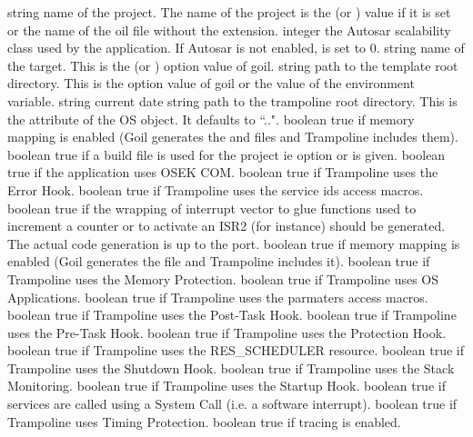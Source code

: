 {string}
{name of the project. The name of the project is the  (or ) value if it is set or the name of the oil file without the extension.} 
{integer}
{the Autosar scalability class used by the application. If Autosar is not enabled,  is set to 0.} 
{string}
{name of the target. This is the  (or ) option value of goil.} 
{string}
{path to the template root directory. This is the  option value of goil or the value of the  environment variable.} 
{string}
{current date} 
{string}
{path to the trampoline root directory. This is the  attribute of the OS object. It defaults to ``..".} 
{boolean}
{true if memory mapping is enabled (Goil generates the  and  files and Trampoline includes them).} 
{boolean}
{true if a build file is used for the project ie option  or  is given.} 
{boolean}
{true if the application uses OSEK COM.} 
{boolean}
{true if Trampoline uses the Error Hook.} 
{boolean}
{true if Trampoline uses the service ids access macros.} 
{boolean}
{true if the wrapping of interrupt vector to glue functions used to increment a counter or to activate an ISR2 (for instance) should be generated. The actual code generation is up to the port.} 
{boolean}
{true if memory mapping is enabled (Goil generates the  file and Trampoline includes it).} 
{boolean}
{true if Trampoline uses the Memory Protection.} 
{boolean}
{true if Trampoline uses OS Applications.} 
{boolean}
{true if Trampoline uses the parmaters access macros.} 
{boolean}
{true if Trampoline uses the Post-Task Hook.} 
{boolean}
{true if Trampoline uses the Pre-Task Hook.} 
{boolean}
{true if Trampoline uses the Protection Hook.} 
{boolean}
{true if Trampoline uses the RES_SCHEDULER resource.} 
{boolean}
{true if Trampoline uses the Shutdown Hook.} 
{boolean}
{true if Trampoline uses the Stack Monitoring.} 
{boolean}
{true if Trampoline uses the Startup Hook.} 
{boolean}
{true if services are called using a System Call (i.e. a software interrupt).} 
{boolean}
{true if Trampoline uses Timing Protection.} 
{boolean}
{true if tracing is enabled.} 
